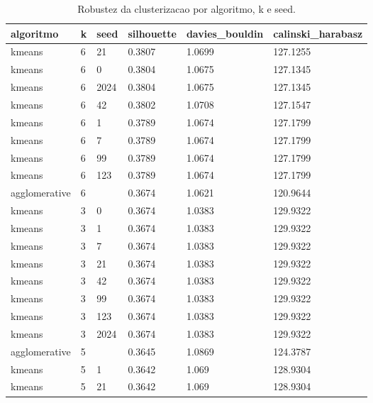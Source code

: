 \begin{table}[htbp]
\centering
\caption{Robustez da clusterizacao por algoritmo, k e seed.}
\label{tab:robustez-clusterizacao}
\begin{tabular}{llllll}
\hline
algoritmo & k & seed & silhouette & davies\_bouldin & calinski\_harabasz \\
\hline
kmeans & 6 & 21 & 0.3807 & 1.0699 & 127.1255 \\
kmeans & 6 & 0 & 0.3804 & 1.0675 & 127.1345 \\
kmeans & 6 & 2024 & 0.3804 & 1.0675 & 127.1345 \\
kmeans & 6 & 42 & 0.3802 & 1.0708 & 127.1547 \\
kmeans & 6 & 1 & 0.3789 & 1.0674 & 127.1799 \\
kmeans & 6 & 7 & 0.3789 & 1.0674 & 127.1799 \\
kmeans & 6 & 99 & 0.3789 & 1.0674 & 127.1799 \\
kmeans & 6 & 123 & 0.3789 & 1.0674 & 127.1799 \\
agglomerative & 6 &  & 0.3674 & 1.0621 & 120.9644 \\
kmeans & 3 & 0 & 0.3674 & 1.0383 & 129.9322 \\
kmeans & 3 & 1 & 0.3674 & 1.0383 & 129.9322 \\
kmeans & 3 & 7 & 0.3674 & 1.0383 & 129.9322 \\
kmeans & 3 & 21 & 0.3674 & 1.0383 & 129.9322 \\
kmeans & 3 & 42 & 0.3674 & 1.0383 & 129.9322 \\
kmeans & 3 & 99 & 0.3674 & 1.0383 & 129.9322 \\
kmeans & 3 & 123 & 0.3674 & 1.0383 & 129.9322 \\
kmeans & 3 & 2024 & 0.3674 & 1.0383 & 129.9322 \\
agglomerative & 5 &  & 0.3645 & 1.0869 & 124.3787 \\
kmeans & 5 & 1 & 0.3642 & 1.069 & 128.9304 \\
kmeans & 5 & 21 & 0.3642 & 1.069 & 128.9304 \\
\hline
\end{tabular}
\end{table}
